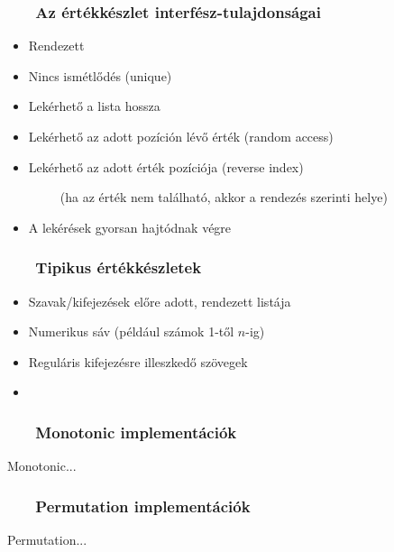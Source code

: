 \documentclass[
]{beamer}
\newcommand{\slidetitle}[2]{\frametitle{{\small #1 ~ \ding{226} ~ } \normalsize \textbf{#2} }}
\begin{document}
\begin{frame}
    \slidetitle{\sectionshorttitle}{Az értékkészlet interfész-tulajdonságai}
    
    \begin{itemize}
        \setlength\itemsep{1em}
        \item Rendezett \pause
        \item Nincs ismétlődés (unique) \pause
        \item Lekérhető a lista hossza \pause
        \item Lekérhető az adott pozíción lévő érték (random access) \pause
        \item Lekérhető az adott érték pozíciója (reverse index) \pause \par
              ~ ~ ~ (ha az érték nem található, akkor a rendezés szerinti helye) \pause
        \item A lekérések gyorsan hajtódnak végre
    \end{itemize}
\end{frame}

\begin{frame}
    \slidetitle{\sectionshorttitle}{Tipikus értékkészletek}
    
    \begin{itemize}
        \setlength\itemsep{1em}
        \item Szavak/kifejezések előre adott, rendezett listája \pause
        \item Numerikus sáv (például számok 1-től $n$-ig) \pause
        \item Reguláris kifejezésre illeszkedő szövegek \pause
        \item 
    \end{itemize}
\end{frame}

\begin{frame}
    \slidetitle{\sectionshorttitle}{Monotonic implementációk}

    Monotonic...
\end{frame}

\begin{frame}
    \slidetitle{\sectionshorttitle}{Permutation implementációk}

    Permutation...
\end{frame}
\end{document}
